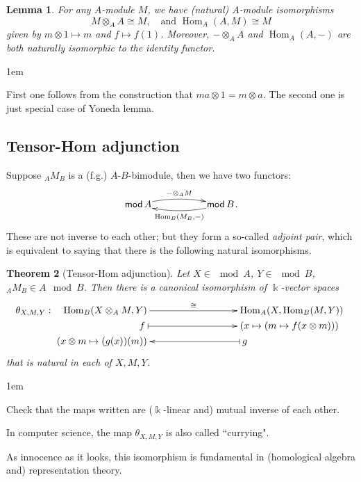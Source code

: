 \documentclass[11pt,a4paper]{article}
\makeatletter
\numberwithin{equation}{section}
\renewenvironment{proof}[1][\proofname]{\par
    \pushQED{\qed}%
    \normalfont \topsep0\p@\@plus6\p@ \labelsep1em\relax
    \trivlist
    \item[\hskip\labelsep\indent
        \bfseries #1]\ignorespaces
    \mbox{}
}{
    \popQED\endtrivlist\@endpefalse
}
\theoremstyle{all}
\newtheorem{theorem}{Theorem}[section]
\newtheorem{lemma}[theorem]{Lemma}
\theoremstyle{remark}
\newcommand{\Hom}{\operatorname{Hom}\nolimits}
\newcommand{\defn}[1]{\textsl{\color{darkblue} #1}}
\makeatother
\begin{document}
\begin{lemma}
For any $A$-module $M$, we have (natural) $A$-module isomorphisms 
\[
M\otimes_AA\cong M, \quad\text{and } \Hom_A(A,M)\cong M
\]
given by $m\otimes 1 \mapsto m$ and $f\mapsto f(1)$.  Moreover, $-\otimes_A A$ and $\Hom_A(A,-)$ are both naturally isomorphic to the identity functor.
\end{lemma}
\begin{proof}
First one follows from the construction that $ma\otimes 1 = m\otimes a$.  The second one is just special case of Yoneda lemma.
\end{proof}


\subsection{Tensor-Hom adjunction}
Suppose ${}_AM_B$ is a (f.g.) $A$-$B$-bimodule, then we have two functors:
\[
\xymatrix@1@C=55pt{ \mod A \ar@/^/[r]^{-\otimes_AM} &\mod B \ar@/^/[l]^{\Hom_B(M_B,-)}}.
\]
These are not inverse to each other; but they form a so-called \defn{adjoint pair}, which is equivalent to saying that there is the following natural isomorphisms.

\begin{theorem}[Tensor-Hom adjunction]
Let $X\in\mod A$, $Y\in\mod B$, ${}_AM_B\in A\mod B$.  Then there is a canonical isomorphism of $\Bbbk$-vector spaces
\[
\theta_{X,M,Y}:\xymatrix@R=0pt@C=0pt{**[l]\Hom_B(X\otimes_AM, Y) \ar[r]^{\cong} & **[r] \Hom_A(X,\Hom_B(M,Y)) \\ 
**[l]{f} \ar@{|->}[r] & **[r] (x\mapsto (m\mapsto f(x\otimes m))) \\
**[l](x\otimes m \mapsto (g(x))(m))& **[r]{g}\ar@{|->}[l] }
\]
that is natural in each of $X,M,Y$.
\end{theorem}
\begin{proof}
Check that the maps written are ($\Bbbk$-linear and) mutual inverse of each other.
\end{proof}

In computer science, the map $\theta_{X,M,Y}$ is also called ``currying".

As innocence as it looks, this isomorphism is fundamental in (homological algebra and) representation theory.
\end{document}
